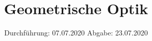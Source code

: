 
\usepackage{color}
\subject{408}
\title{Geometrische Optik}
\date{%
  Durchführung: 07.07.2020
  \hspace{3em}
  Abgabe: 23.07.2020
}



\maketitle
\thispagestyle{empty}
\tableofcontents
\newpage






\nocite{V408}
\printbibliography{}


